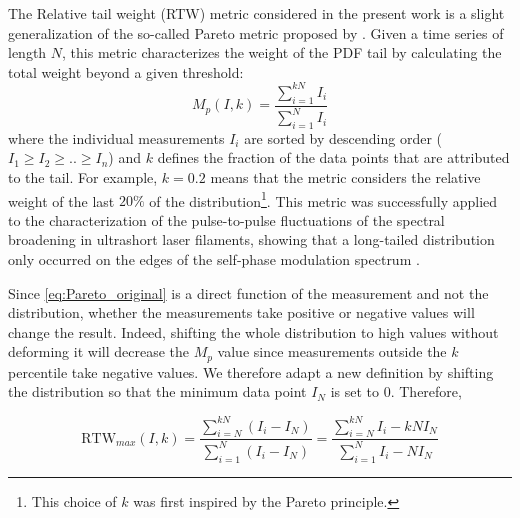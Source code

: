 The Relative tail weight (RTW) metric considered in the present work is a slight generalization of the so-called Pareto metric proposed by \cite{Kasparian_pareto}. 
Given a time series of length $N$, this metric characterizes the weight of the PDF tail by calculating the total weight beyond a given threshold:
\begin{equation}
	M_p(I,k)=\frac{\sum^{k N}_{i=1} I_i}{\sum^{N}_{i=1} I_i}
	\label{eq:Pareto_original}
\end{equation}
where the  individual measurements $I_i$ are sorted by descending order ($I_1\geq I_2\geq .. \geq I_n$) and $k$ defines the fraction of the data points that are attributed to the tail. 
For example, $k=0.2$ means that the metric considers the relative weight of the last $20\%$ of the distribution\footnote{This choice of $k$ was first inspired by the Pareto principle.}. 
This metric was successfully applied to the characterization of the pulse-to-pulse fluctuations of the spectral broadening in ultrashort laser filaments, showing that a long-tailed distribution only occurred on the edges of the self-phase modulation spectrum \citep{Kasparian_pareto}.

Since \cref{eq:Pareto_original} is a direct function of the measurement and not the distribution, whether the measurements take positive or negative values will change the result. 
Indeed, shifting the whole distribution to high values without deforming it will decrease the $M_p$ value since  measurements outside the $k$ percentile take negative values. 
We therefore adapt a new definition by shifting the distribution so that the minimum data point $I_N$ is set to 0. Therefore,

\begin{equation}
	\mathrm{RTW}_{max}(I,k)=\frac{\sum^{k N}_{i=N} (I_i-I_N)}{\sum^{N}_{i=1} (I_i-I_N)}=\frac{\sum^{k N}_{i=N} I_i-k N I_N}{\sum^{N}_{i=1} I_i-NI_N} 
	\label{eq:pareto_offset}
\end{equation}


	
